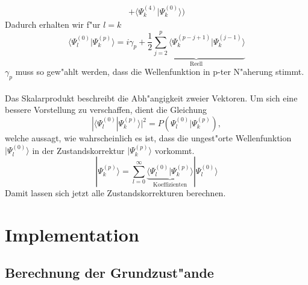 \begin{refsection}
\begin{align*}
+\langle\Psi_k^{(4)}|\Psi_k^{(0)}\rangle\bigr)
\end{align*}
Dadurch erhalten wir f"ur $l=k$
\begin{equation}
\langle\Psi_l^{(0)}|\Psi_k^{(p)}\rangle
=
i\gamma_p+
\underbrace{\frac12 \displaystyle\sum_{j=2}^{p} 
\langle\Psi_k^{(p-j+1)}|\Psi_k^{(j-1)}\rangle}_{\text{Reell}}
\end{equation}
$\gamma_p$ muss so gew"ahlt werden, dass die Wellenfunktion in p-ter N"aherung stimmt.
\\
\\
Das Skalarprodukt beschreibt die Abh"angigkeit zweier Vektoren.
Um sich eine bessere Vorstellung zu verschaffen, dient die Gleichung
\[
|\langle\Psi_l^{(0)}|\Psi_k^{(p)}\rangle|^2
=
P(\Psi_l^{(0)}|\Psi_k^{(p)}),
\]
welche aussagt, wie wahrscheinlich es ist,
dass die ungest"orte Wellenfunktion $|\Psi_l^{(0)}\rangle$
in der Zustandskorrektur $|\Psi_k^{(p)}\rangle$ vorkommt.
\begin{equation}
|\Psi_k^{(p)}\rangle
=
\displaystyle\sum_{l=0}^{\infty}
\underbrace{\langle\Psi_l^{(0)}|\Psi_k^{(p)}\rangle}_{\text{Koeffizienten}}
|\Psi_l^{(0)}\rangle
\end{equation}
Damit lassen sich jetzt alle Zustandskorrekturen berechnen.

\section{Implementation}
\subsection{Berechnung der Grundzust"ande}


\end{refsection}
